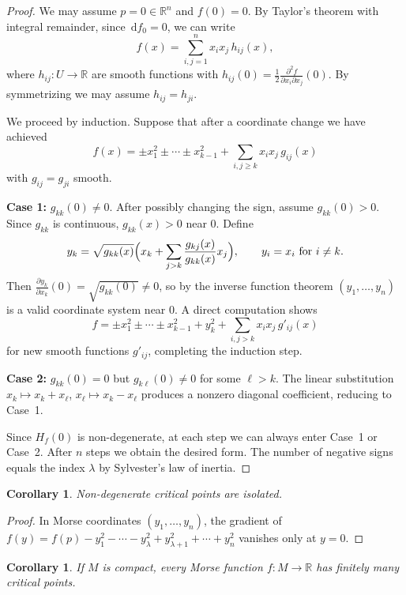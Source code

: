 \documentclass[12pt,a4paper,openany]{book}
\newtheorem{corollary}[theorem]{Corollary}
\theoremstyle{definition}
\theoremstyle{remark}
\newcommand{\R}{\mathbb{R}}
\newcommand{\dd}{\,\mathrm{d}}
\begin{document}
\begin{proof}
We may assume $p = 0 \in \R^n$ and $f(0) = 0$. By Taylor's theorem
with integral remainder, since $\dd f_0 = 0$, we can write
\[
  f(x) = \sum_{i,j=1}^n x_i x_j \, h_{ij}(x),
\]
where $h_{ij} \colon U \to \R$ are smooth functions with
$h_{ij}(0) = \frac{1}{2}\frac{\partial^2 f}{\partial x_i \partial x_j}(0)$.
By symmetrizing we may assume $h_{ij} = h_{ji}$.

We proceed by induction. Suppose that after a coordinate change
we have achieved
\[
  f(x) = \pm x_1^2 \pm \cdots \pm x_{k-1}^2 +
  \sum_{i,j \ge k} x_i x_j \, g_{ij}(x)
\]
with $g_{ij} = g_{ji}$ smooth.

\textbf{Case 1:} $g_{kk}(0) \neq 0$.
After possibly changing the sign, assume $g_{kk}(0) > 0$.
Since $g_{kk}$ is continuous, $g_{kk}(x) > 0$ near $0$.
Define
\[
  y_k = \sqrt{g_{kk}(x)}\Bigl(x_k + \sum_{j>k}\frac{g_{kj}(x)}{g_{kk}(x)}x_j\Bigr),
  \qquad y_i = x_i \text{ for } i \neq k.
\]
Then $\frac{\partial y_k}{\partial x_k}(0) = \sqrt{g_{kk}(0)} \neq 0$,
so by the inverse function theorem $(y_1,\dots,y_n)$ is a valid
coordinate system near $0$. A direct computation shows
\[
  f = \pm x_1^2 \pm \cdots \pm x_{k-1}^2 + y_k^2 +
  \sum_{i,j > k} x_i x_j\, g'_{ij}(x)
\]
for new smooth functions $g'_{ij}$, completing the induction step.

\textbf{Case 2:} $g_{kk}(0) = 0$ but $g_{k\ell}(0) \neq 0$ for some $\ell > k$.
The linear substitution $x_k \mapsto x_k + x_\ell$,
$x_\ell \mapsto x_k - x_\ell$ produces a nonzero diagonal coefficient,
reducing to Case~1.

Since $H_f(0)$ is non-degenerate, at each step we can always enter
Case~1 or Case~2. After $n$ steps we obtain the desired form.
The number of negative signs equals the index $\lambda$ by
Sylvester's law of inertia.
\end{proof}

\begin{corollary}\label{cor:morse-isolated}
Non-degenerate critical points are isolated.
\end{corollary}

\begin{proof}
In Morse coordinates $(y_1,\dots,y_n)$, the gradient of
$f(y) = f(p) - y_1^2 - \cdots - y_\lambda^2 + y_{\lambda+1}^2 + \cdots + y_n^2$
vanishes only at $y = 0$.
\end{proof}

\begin{corollary}\label{cor:morse-compact-finite}
If $M$ is compact, every Morse function $f\colon M \to \R$ has
finitely many critical points.
\end{corollary}
\end{document}
